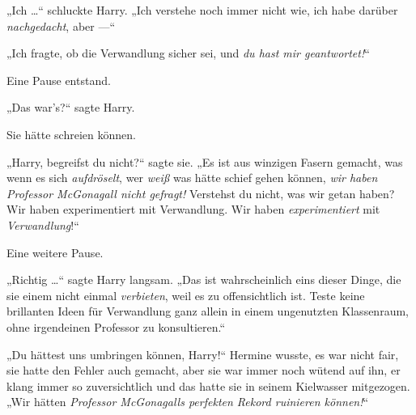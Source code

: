 „Ich …“ schluckte Harry.
„Ich verstehe noch immer nicht wie, ich habe darüber \emph{nachgedacht}, aber —“

„Ich fragte, ob die Verwandlung sicher sei, und \emph{du hast mir geantwortet!}“

Eine Pause entstand.

„Das war’s?“ sagte Harry.

Sie hätte schreien können.

„Harry, begreifst du nicht?“ sagte sie.
„Es ist aus winzigen Fasern gemacht, was wenn es sich \emph{aufdröselt}, wer \emph{weiß} was hätte schief gehen können, \emph{wir haben Professor McGonagall nicht gefragt!} Verstehst du nicht, was wir getan haben? Wir haben experimentiert mit Verwandlung. Wir haben \emph{experimentiert} mit \emph{Verwandlung}!“

Eine weitere Pause.

„Richtig …“ sagte Harry langsam.
„Das ist wahrscheinlich eins dieser Dinge, die sie einem nicht einmal \emph{verbieten}, weil es zu offensichtlich ist. Teste keine brillanten Ideen für Verwandlung ganz allein in einem ungenutzten Klassenraum, ohne irgendeinen Professor zu konsultieren.“

„Du hättest uns umbringen können, Harry!“ Hermine wusste, es war nicht fair, sie hatte den Fehler auch gemacht, aber sie war immer noch wütend auf ihn, er klang immer so zuversichtlich und das hatte sie in seinem Kielwasser mitgezogen.
„Wir hätten \emph{Professor McGonagalls perfekten Rekord ruinieren können!}“

